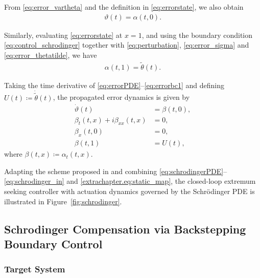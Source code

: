 \documentclass[letterpaper, 10 pt, conference]{ieeeconf}  %
\begin{document}
From \eqref{eq:error_vartheta} and the definition in \eqref{eq:errorstate}, we also obtain
\begin{align}
    \vartheta(t) = \alpha(t,0). \label{eq:erroTheta}
\end{align}

Similarly, evaluating \eqref{eq:errorstate} at $x=1$, and using the boundary condition \eqref{eq:control_schrodinger} together with \eqref{eq:perturbation}, \eqref{eq:error_sigma} and \eqref{eq:error_thetatilde}, we have
\begin{align}
    \alpha(t,1) = \tilde{\theta}(t). \label{eq:errorbc1}
\end{align}

Taking the time derivative of \eqref{eq:errorPDE}--\eqref{eq:errorbc1} and defining $U(t)\coloneqq \dot{\tilde{\theta}}(t)$, the propagated error dynamics is given by
\begin{align}
    \dot{\vartheta}(t) &= \beta(t,0), \label{eq:ODE1errordynamics}\\
    \beta_{t}(t,x) + i\beta_{xx}(t,x) &= 0, \label{eq:PDEerrordynamics}\\
    \beta_{x}(t,0) &= 0, \label{eq:BC0errordynamics}\\
    \beta(t,1) &= U(t), \label{eq:BCUerrordynamics}
\end{align}
where $\beta(t,x) \coloneqq \alpha_{t}(t,x)$.

Adapting the scheme proposed in \cite{book2022} and combining \eqref{eq:schrodingerPDE}--\eqref{eq:schrodinger_in} and \eqref{extrachapter.eq:static_map}, the closed-loop extremum seeking controller with actuation dynamics governed by the Schrödinger PDE is illustrated in Figure~\ref{fig:schrodinger}.



\subsection{Schrodinger Compensation via Backstepping Boundary Control}

\subsubsection{Target System}
\end{document}
